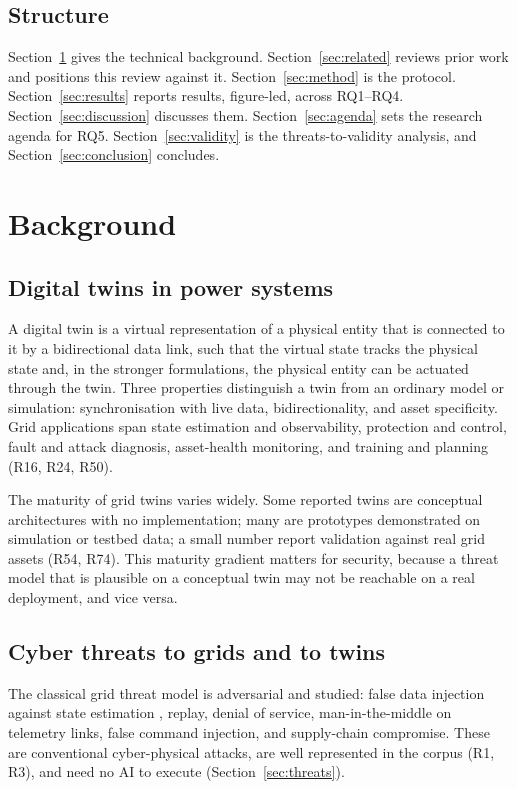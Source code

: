 \documentclass[preprint,12pt]{elsarticle}
\renewcommand{\_}{\plainunderscore\allowbreak}
\begin{document}
\subsection{Structure}

Section~\ref{sec:background} gives the technical background.
Section~\ref{sec:related} reviews prior work and positions this review against it.
Section~\ref{sec:method} is the protocol.
Section~\ref{sec:results} reports results, figure-led, across RQ1--RQ4.
Section~\ref{sec:discussion} discusses them.
Section~\ref{sec:agenda} sets the research agenda for RQ5.
Section~\ref{sec:validity} is the threats-to-validity analysis, and
Section~\ref{sec:conclusion} concludes.

\section{Background}\label{sec:background}

\subsection{Digital twins in power systems}

A digital twin \cite{grieves2014,glaessgen2012,tao2019} is a virtual representation of a
physical entity that is connected to it by a
bidirectional data link, such that the virtual state tracks the physical state and, in the
stronger formulations, the physical entity can be actuated through the twin. Three properties
distinguish a twin from an ordinary model or simulation: synchronisation with live data,
bidirectionality, and asset specificity. Grid applications span state estimation and
observability, protection and control, fault and attack diagnosis, asset-health monitoring, and
training and planning (R16, R24, R50).

The maturity of grid twins varies widely. Some reported twins are conceptual architectures with
no implementation; many are prototypes demonstrated on simulation or testbed data; a small
number report validation against real grid assets (R54, R74). This maturity gradient
matters for security, because a threat model that is plausible on a conceptual twin may not be
reachable on a real deployment, and vice versa.

\subsection{Cyber threats to grids and to twins}

The classical grid threat model is adversarial and studied: false data injection against state
estimation \cite{liu2011,liang2017}, replay, denial of service, man-in-the-middle on telemetry
links, false command injection, and supply-chain compromise. These are conventional
cyber-physical attacks, are well represented in the corpus (R1, R3), and
need no AI to execute (Section~\ref{sec:threats}).
\end{document}
